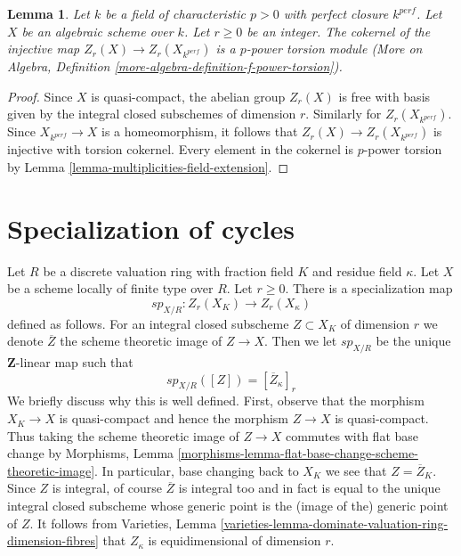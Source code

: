 \documentclass{stacks-project}
\theoremstyle{plain}
\newtheorem{lemma}[subsection]{Lemma}
\theoremstyle{definition}
\theoremstyle{remark}
\numberwithin{equation}{subsection}
\begin{document}
\begin{lemma}
\label{lemma-how-different}
Let $k$ be a field of characteristic $p > 0$ with perfect closure $k^{perf}$.
Let $X$ be an algebraic scheme over $k$. Let $r \geq 0$ be an integer.
The cokernel of the injective map $Z_r(X) \to Z_r(X_{k^{perf}})$ is a
$p$-power torsion module (More on Algebra, Definition
\ref{more-algebra-definition-f-power-torsion}).
\end{lemma}

\begin{proof}
Since $X$ is quasi-compact, the abelian group $Z_r(X)$ is free with basis
given by the integral closed subschemes of dimension $r$. Similarly for
$Z_r(X_{k^{perf}})$.
Since $X_{k^{perf}} \to X$ is a homeomorphism, it follows
that $Z_r(X) \to Z_r(X_{k^{perf}})$ is injective with torsion cokernel.
Every element in the cokernel is $p$-power torsion by
Lemma \ref{lemma-multiplicities-field-extension}.
\end{proof}





\section{Specialization of cycles}
\label{section-specialization}

\noindent
Let $R$ be a discrete valuation ring with fraction field $K$
and residue field $\kappa$. Let $X$ be a scheme locally of finite type
over $R$. Let $r \geq 0$. There is a specialization map
$$
sp_{X/R} : Z_r(X_K) \longrightarrow Z_r(X_\kappa)
$$
defined as follows. For an integral closed subscheme $Z \subset X_K$
of dimension $r$ we denote $\overline{Z}$ the scheme theoretic image
of $Z \to X$. Then we let $sp_{X/R}$ be the unique $\mathbf{Z}$-linear
map such that
$$
sp_{X/R}([Z]) = [\overline{Z}_\kappa]_r
$$
We briefly discuss why this is well defined. First, observe that the
morphism $X_K \to X$ is quasi-compact and hence the morphism $Z \to X$
is quasi-compact. Thus taking the scheme theoretic image of $Z \to X$
commutes with flat base change by
Morphisms, Lemma \ref{morphisms-lemma-flat-base-change-scheme-theoretic-image}.
In particular, base changing back to $X_K$ we see that $Z = \overline{Z}_K$.
Since $Z$ is integral, of course $\overline{Z}$ is integral too and
in fact is equal to the unique integral closed subscheme whose generic
point is the (image of the) generic point of $Z$. It follows from
Varieties, Lemma \ref{varieties-lemma-dominate-valuation-ring-dimension-fibres}
that $Z_\kappa$ is equidimensional of dimension $r$.
\end{document}

